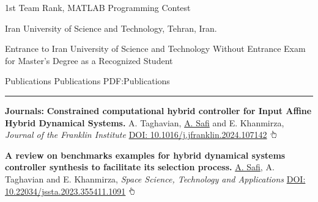 \documentclass[letterpaper,MMMyyyy]{CVTemplate}
\begin{document}
\begin{Body}
\Gap
\vspace{6pt}
\BulletItem
1st Team Rank, MATLAB Programming Contest
\hfill
\textcolor{OrangeY}{}
\begin{Detail}
\Item
Iran University of Science and Technology, Tehran, Iran.
\end{Detail}

\Gap
\vspace{6pt}
\BulletItem
Entrance to Iran University of Science and Technology Without Entrance Exam for Master's Degree as a Recognized Student
\hfill
\textcolor{OrangeY}{}





\Section
{Publications}
{Publications}
{PDF:Publications}
\textcolor{Forestg}{\vspace{0.10cm}\hrule height 0.1cm}\BigGap\Gap
\begingroup
\BigGap
\textcolor{Forestg}{\textbf{Journals:}}
\vspace{4pt}
\BulletItem
\textbf{Constrained computational hybrid controller for Input Affine Hybrid Dynamical Systems.}
A. Taghavian, \underline{A. Safi} and E. Khanmirza,
\textit{Journal of the Franklin Institute} 
\newline
\href{https://doi.org/10.1016/j.jfranklin.2024.107142}{DOI: \textcolor{Forestg}{10.1016/j.jfranklin.2024.107142}}
\includegraphics[height=9pt]{icons/hand-cursor.png}
\hfill
\textcolor{OrangeY}{}

\Gap\vspace{6pt}
\vspace{4pt}
\BulletItem
\textbf{A review on benchmarks examples for hybrid dynamical systems controller synthesis to facilitate its selection process.}
\underline{A. Safi}, A. Taghavian and E. Khanmirza,
\textit{Space Science, Technology and Applications} 
\newline
\href{https://journal.isrc.ac.ir/article_164991.html?lang=en}{DOI: \textcolor{Forestg}{10.22034/jssta.2023.355411.1091}}
\includegraphics[height=9pt]{icons/hand-cursor.png}
\hfill
\textcolor{OrangeY}{}




\end{Body}
\end{document}
